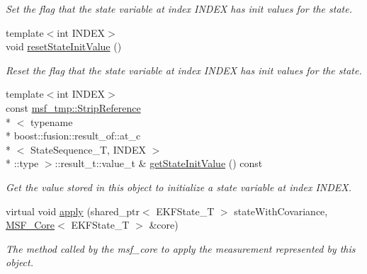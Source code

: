 \begin{DoxyCompactItemize}
\begin{DoxyCompactList}\small\item\em Set the flag that the state variable at index I\-N\-D\-E\-X has init values for the state. \end{DoxyCompactList}\item 
\hypertarget{classmsf__core_1_1MSF__InitMeasurement_aa95a1f961bac237267d133035a113728}{{\footnotesize template$<$int I\-N\-D\-E\-X$>$ }\\void \hyperlink{classmsf__core_1_1MSF__InitMeasurement_aa95a1f961bac237267d133035a113728}{reset\-State\-Init\-Value} ()}\label{classmsf__core_1_1MSF__InitMeasurement_aa95a1f961bac237267d133035a113728}

\begin{DoxyCompactList}\small\item\em Reset the flag that the state variable at index I\-N\-D\-E\-X has init values for the state. \end{DoxyCompactList}\item 
\hypertarget{classmsf__core_1_1MSF__InitMeasurement_acd59df20e43b7151b1549b1a43a93511}{{\footnotesize template$<$int I\-N\-D\-E\-X$>$ }\\const \hyperlink{structmsf__tmp_1_1StripReference}{msf\-\_\-tmp\-::\-Strip\-Reference}\\*
$<$ typename \\*
boost\-::fusion\-::result\-\_\-of\-::at\-\_\-c\\*
$<$ State\-Sequence\-\_\-\-T, I\-N\-D\-E\-X $>$\\*
\-::type $>$\-::result\-\_\-t\-::value\-\_\-t \& \hyperlink{classmsf__core_1_1MSF__InitMeasurement_acd59df20e43b7151b1549b1a43a93511}{get\-State\-Init\-Value} () const }\label{classmsf__core_1_1MSF__InitMeasurement_acd59df20e43b7151b1549b1a43a93511}

\begin{DoxyCompactList}\small\item\em Get the value stored in this object to initialize a state variable at index I\-N\-D\-E\-X. \end{DoxyCompactList}\item 
\hypertarget{classmsf__core_1_1MSF__InitMeasurement_a7b92f1e55007491bec20273f6cc25ba6}{virtual void \hyperlink{classmsf__core_1_1MSF__InitMeasurement_a7b92f1e55007491bec20273f6cc25ba6}{apply} (shared\-\_\-ptr$<$ E\-K\-F\-State\-\_\-\-T $>$ state\-With\-Covariance, \hyperlink{classmsf__core_1_1MSF__Core}{M\-S\-F\-\_\-\-Core}$<$ E\-K\-F\-State\-\_\-\-T $>$ \&core)}\label{classmsf__core_1_1MSF__InitMeasurement_a7b92f1e55007491bec20273f6cc25ba6}

\begin{DoxyCompactList}\small\item\em The method called by the msf\-\_\-core to apply the measurement represented by this object. \end{DoxyCompactList}\end{DoxyCompactItemize}
